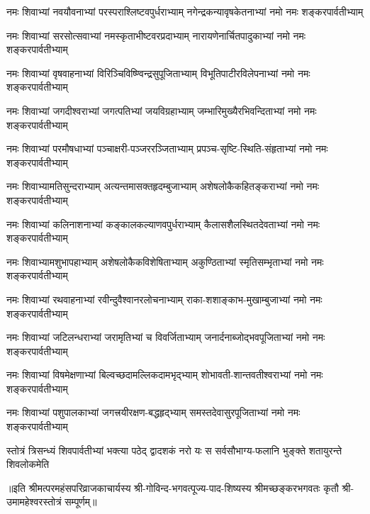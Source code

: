 
\begin{AutoCols}[\maxColumns]
\fourlineindentedshloka
{नमः शिवाभ्यां नवयौवनाभ्यां}
{परस्पराश्लिष्टवपुर्धराभ्याम्}
{नगेन्द्रकन्यावृषकेतनाभ्यां}
{नमो नमः शङ्करपार्वतीभ्याम्}%

\fourlineindentedshloka
{नमः शिवाभ्यां सरसोत्सवाभ्यां}
{नमस्कृताभीष्टवरप्रदाभ्याम्}
{नारायणेनार्चितपादुकाभ्यां}
{नमो नमः शङ्करपार्वतीभ्याम्}%

\fourlineindentedshloka
{नमः शिवाभ्यां वृषवाहनाभ्यां}
{विरिञ्चिविष्ण्विन्द्रसुपूजिताभ्याम्}
{विभूतिपाटीरविलेपनाभ्यां}
{नमो नमः शङ्करपार्वतीभ्याम्}%

\fourlineindentedshloka
{नमः शिवाभ्यां जगदीश्वराभ्यां}
{जगत्पतिभ्यां जयविग्रहाभ्याम्}
{जम्भारिमुख्यैरभिवन्दिताभ्यां}
{नमो नमः शङ्करपार्वतीभ्याम्}%

\fourlineindentedshloka
{नमः शिवाभ्यां परमौषधाभ्यां}
{पञ्चाक्षरी-पञ्जररञ्जिताभ्याम्}
{प्रपञ्च-सृष्टि-स्थिति-संहृताभ्यां}
{नमो नमः शङ्करपार्वतीभ्याम्}%

\fourlineindentedshloka
{नमः शिवाभ्यामतिसुन्दराभ्याम्}
{अत्यन्तमासक्तहृदम्बुजाभ्याम्}
{अशेषलोकैकहितङ्कराभ्यां}
{नमो नमः शङ्करपार्वतीभ्याम्}%

\fourlineindentedshloka
{नमः शिवाभ्यां कलिनाशनाभ्यां}
{कङ्कालकल्याणवपुर्धराभ्याम्}
{कैलासशैलस्थितदेवताभ्यां}
{नमो नमः शङ्करपार्वतीभ्याम्}%

\fourlineindentedshloka
{नमः शिवाभ्यामशुभापहाभ्याम्}
{अशेषलोकैकविशेषिताभ्याम्}
{अकुण्ठिताभ्यां स्मृतिसम्भृताभ्यां}
{नमो नमः शङ्करपार्वतीभ्याम्}%

\fourlineindentedshloka
{नमः शिवाभ्यां रथवाहनाभ्यां}
{रवीन्दुवैश्वानरलोचनाभ्याम्}
{राका-शशाङ्काभ-मुखाम्बुजाभ्यां}
{नमो नमः शङ्करपार्वतीभ्याम्}%

\fourlineindentedshloka
{नमः शिवाभ्यां जटिलन्धराभ्यां}
{जरामृतिभ्यां च विवर्जिताभ्याम्}
{जनार्दनाब्जोद्भवपूजिताभ्यां}
{नमो नमः शङ्करपार्वतीभ्याम्}%

\fourlineindentedshloka
{नमः शिवाभ्यां विषमेक्षणाभ्यां}
{बिल्वच्छदामल्लिकदामभृद्भ्याम्}
{शोभावती-शान्तवतीश्वराभ्यां}
{नमो नमः शङ्करपार्वतीभ्याम्}%

\fourlineindentedshloka
{नमः शिवाभ्यां पशुपालकाभ्यां}
{जगत्त्रयीरक्षण-बद्धहृद्भ्याम्}
{समस्तदेवासुरपूजिताभ्यां}
{नमो नमः शङ्करपार्वतीभ्याम्}%

\fourlineindentedshloka
{स्तोत्रं त्रिसन्ध्यं शिवपार्वतीभ्यां}
{भक्त्या पठेद् द्वादशकं नरो यः}
{स सर्वसौभाग्य-फलानि भुङ्क्ते}
{शतायुरन्ते शिवलोकमेति}%

{॥इति श्रीमत्परमहंसपरिव्राजकाचार्यस्य श्री-गोविन्द-भगवत्पूज्य-पाद-शिष्यस्य
श्रीमच्छङ्करभगवतः कृतौ श्री-उमामहेश्वरस्तोत्रं सम्पूर्णम्॥}

\end{AutoCols}